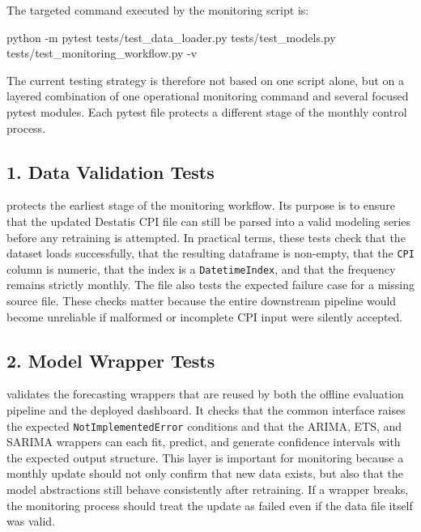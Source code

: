 The targeted command executed by the monitoring script is:

\begin{Python}[caption={Monitoring-oriented test command}, label={lst:monitoring-pytest-command}]
python -m pytest tests/test_data_loader.py tests/test_models.py tests/test_monitoring_workflow.py -v
\end{Python}

The current testing strategy is therefore not based on one script alone, but on a layered combination of one operational monitoring command and several focused pytest modules. Each pytest file protects a different stage of the monthly control process.

\subsection*{1. Data Validation Tests}

 protects the earliest stage of the monitoring workflow. Its purpose is to ensure that the updated Destatis CPI file can still be parsed into a valid modeling series before any retraining is attempted. In practical terms, these tests check that the dataset loads successfully, that the resulting dataframe is non-empty, that the \texttt{CPI} column is numeric, that the index is a \texttt{DatetimeIndex}, and that the frequency remains strictly monthly. The file also tests the expected failure case for a missing source file. These checks matter because the entire downstream pipeline would become unreliable if malformed or incomplete CPI input were silently accepted.

\subsection*{2. Model Wrapper Tests}

 validates the forecasting wrappers that are reused by both the offline evaluation pipeline and the deployed dashboard. It checks that the common interface raises the expected \texttt{NotImplementedError} conditions and that the ARIMA, ETS, and SARIMA wrappers can each fit, predict, and generate confidence intervals with the expected output structure. This layer is important for monitoring because a monthly update should not only confirm that new data exists, but also that the model abstractions still behave consistently after retraining. If a wrapper breaks, the monitoring process should treat the update as failed even if the data file itself was valid.

